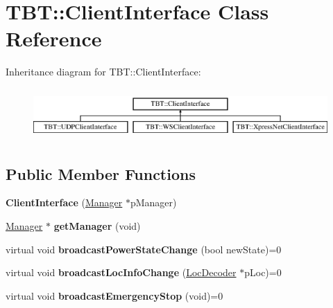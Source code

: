 \hypertarget{classTBT_1_1ClientInterface}{}\section{T\+BT\+:\+:Client\+Interface Class Reference}
\label{classTBT_1_1ClientInterface}
Inheritance diagram for T\+BT\+:\+:Client\+Interface\+:\begin{figure}[H]
\begin{center}
\leavevmode
\includegraphics[height=1.975309cm]{classTBT_1_1ClientInterface}
\end{center}
\end{figure}
\subsection*{Public Member Functions}
\begin{DoxyCompactItemize}
\item 
\mbox{\label{classTBT_1_1ClientInterface_a77cd35b080e78932f2371ea0f897964b}} 
{\bfseries Client\+Interface} (\hyperlink{classTBT_1_1Manager}{Manager} $\ast$p\+Manager)
\item 
\mbox{\label{classTBT_1_1ClientInterface_a26e144856b1253744b20c5638065acf7}} 
\hyperlink{classTBT_1_1Manager}{Manager} $\ast$ {\bfseries get\+Manager} (void)
\item 
\mbox{\label{classTBT_1_1ClientInterface_a7888a3446fb416fad75e5e008a85ca0c}} 
virtual void {\bfseries broadcast\+Power\+State\+Change} (bool new\+State)=0
\item 
\mbox{\label{classTBT_1_1ClientInterface_aaede3709fa0dcb23743f43d9c1a5ab04}} 
virtual void {\bfseries broadcast\+Loc\+Info\+Change} (\hyperlink{classTBT_1_1LocDecoder}{Loc\+Decoder} $\ast$p\+Loc)=0
\item 
\mbox{\label{classTBT_1_1ClientInterface_a8d19220baccb47a7c9f45d0288bebcb8}} 
virtual void {\bfseries broadcast\+Emergency\+Stop} (void)=0
\end{DoxyCompactItemize}
